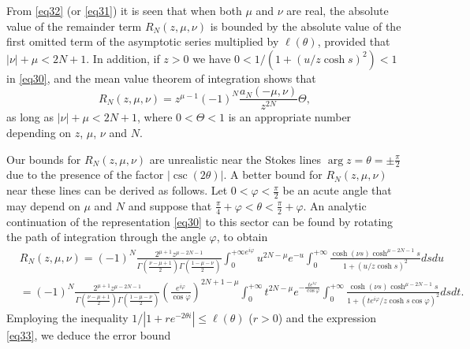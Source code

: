 \documentclass[a4paper,twoside,10pt]{amsart}
\numberwithin{equation}{section}
\begin{document}
From \eqref{eq32} (or \eqref{eq31}) it is seen that when both $\mu$ and $\nu$ are real, the absolute value of the remainder term $R_N \left( {z,\mu ,\nu } \right)$ is bounded by the absolute value of the first omitted term of the asymptotic series multiplied by $\ell \left( \theta  \right)$, provided that $\left| \nu  \right| + \mu  < 2N + 1$. In addition, if $z>0$ we have $0 < 1/\left( {1 + \left( {u/z\cosh s} \right)^2 } \right) < 1$ in \eqref{eq30}, and the mean value theorem of integration shows that
\[
R_N \left( {z,\mu ,\nu } \right) = z^{\mu  - 1} \left( { - 1} \right)^N \frac{{a_N \left( { - \mu ,\nu } \right)}}{z^{2N}}\Theta ,
\]
as long as $\left| \nu  \right| + \mu  < 2N + 1$, where $0<\Theta<1$ is an appropriate number depending on $z$, $\mu$, $\nu$ and $N$.

Our bounds for $R_N \left( {z,\mu ,\nu } \right)$ are unrealistic near the Stokes lines $\arg z = \theta = \pm \frac{\pi }{2}$ due to the presence of the factor $\left|\csc \left(2\theta\right)\right|$. A better bound for $R_N \left( {z,\mu ,\nu } \right)$ near these lines can be derived as follows. Let $0 < \varphi  < \frac{\pi }{2}$ be an acute angle that may depend on $\mu$ and $N$ and suppose that $\frac{\pi }{4} + \varphi  < \theta  < \frac{\pi }{2} + \varphi$. An analytic continuation of the representation \eqref{eq30} to this sector can be found by rotating the path of integration through the angle $\varphi$, to obtain
\begin{align*}
& R_N \left( {z,\mu ,\nu } \right) = \left( { - 1} \right)^N \frac{{2^{\mu  + 1} z^{\mu  - 2N - 1} }}{{\Gamma \left( {\frac{{\nu  - \mu  + 1}}{2}} \right)\Gamma \left( {\frac{{1 - \mu  - \nu }}{2}} \right)}}\int_0^{ + \infty e^{i\varphi } } {u^{2N - \mu } e^{ - u} \int_0^{ + \infty } {\frac{{\cosh \left( {\nu s} \right)\cosh ^{\mu  - 2N - 1} s}}{{1 + \left( {u/z\cosh s} \right)^2 }}ds} du} 
\\ & = \left( { - 1} \right)^N \frac{{2^{\mu  + 1} z^{\mu  - 2N - 1} }}{{\Gamma \left( {\frac{{\nu  - \mu  + 1}}{2}} \right)\Gamma \left( {\frac{{1 - \mu  - \nu }}{2}} \right)}}\left( {\frac{{e^{i\varphi } }}{{\cos \varphi }}} \right)^{2N + 1 - \mu } \int_0^{ + \infty } {t^{2N - \mu } e^{ - \frac{{te^{i\varphi } }}{{\cos \varphi }}} \int_0^{ + \infty } {\frac{{\cosh \left( {\nu s} \right)\cosh ^{\mu  - 2N - 1} s}}{{1 + \left( {te^{i\varphi } /z\cosh s\cos \varphi } \right)^2 }}ds} dt} .
\end{align*}
Employing the inequality $1/\left| {1 + re^{ - 2\theta i} } \right| \le \ell \left( \theta  \right)$ ($r>0$) and the expression \eqref{eq33}, we deduce the error bound
\end{document}
